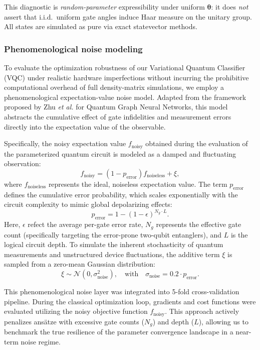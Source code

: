 \documentclass[11pt]{article}
\begin{document}
This diagnostic is \emph{random-parameter} expressibility under uniform $\boldsymbol{\theta}$: it does \emph{not} assert that i.i.d.\ uniform gate angles induce Haar measure on the unitary group. All states are simulated as pure via exact statevector methods.

\subsubsection{Phenomenological noise modeling}

To evaluate the optimization robustness of our Variational Quantum Classifier (VQC) under realistic hardware imperfections without incurring the prohibitive computational overhead of full density-matrix simulations, we employ a phenomenological expectation-value noise model. Adapted from the framework proposed by Zhu \textit{et al.} for Quantum Graph Neural Networks\cite{Zhu2026}, this model abstracts the cumulative effect of gate infidelities and measurement errors directly into the expectation value of the observable.

Specifically, the noisy expectation value $f_{\text{noisy}}$ obtained during the evaluation of the parameterized quantum circuit is modeled as a damped and fluctuating observation:
\begin{equation}
    f_{\text{noisy}} = (1 - p_{\text{error}}) f_{\text{noiseless}} + \xi,
\end{equation}
where $f_{\text{noiseless}}$ represents the ideal, noiseless expectation value. The term $p_{\text{error}}$ defines the cumulative error probability, which scales exponentially with the circuit complexity to mimic global depolarizing effects:
\begin{equation}
    p_{\text{error}} = 1 - (1 - \epsilon)^{N_g \cdot L}.
\end{equation}
Here, $\epsilon$ refect the average per-gate error rate, $N_g$ represents the effective gate count (specifically targeting the error-prone two-qubit entanglers), and $L$ is the logical circuit depth. To simulate the inherent stochasticity of quantum measurements and unstructured device fluctuations, the additive term $\xi$ is sampled from a zero-mean Gaussian distribution:
\begin{equation}
    \xi \sim \mathcal{N}(0, \sigma_{\text{noise}}^2), \quad \text{with} \quad \sigma_{\text{noise}} = 0.2 \cdot p_{\text{error}}.
\end{equation}

This phenomenological noise layer was integrated into 5-fold cross-validation pipeline. During the classical optimization loop, gradients and cost functions were evaluated utilizing the noisy objective function $f_{\text{noisy}}$. This approach actively penalizes ans\"atze with excessive gate counts ($N_g$) and depth ($L$), allowing us to benchmark the true resilience of the parameter convergence landscape in a near-term noise regime.
\end{document}
